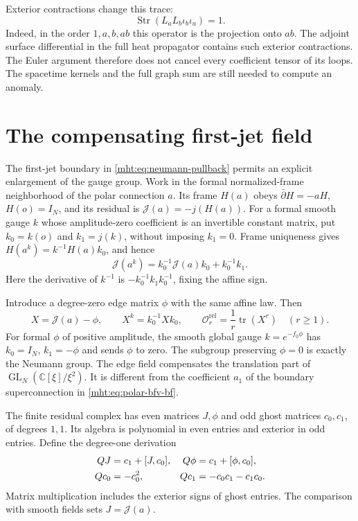 Exterior contractions change this trace:
\begin{equation}\label{mht:eq:surface-loop-detector}
 \operatorname{Str}(L_aL_b\iota_b\iota_a)=1.
\end{equation}
Indeed, in the order $1,a,b,ab$ this operator is the projection
onto $ab$. The adjoint surface differential in the full heat
propagator contains such exterior contractions. The Euler argument
therefore does not cancel every coefficient tensor of its loops.
The spacetime kernels and the full graph sum are still needed to
compute an anomaly.

\section{The compensating first-jet field}

The first-jet boundary in \eqref{mht:eq:neumann-pullback}
permits an explicit enlargement of the gauge group. Work in the
formal normalized-frame neighborhood of the polar connection $a$.
Its frame $H(a)$ obeys $\bar\partial H=-aH$, $H(o)=I_N$, and its
residual is $\mathcal J(a)=-j(H(a))$.
For a formal smooth gauge $k$ whose amplitude-zero coefficient is
an invertible constant matrix, put
$k_0=k(o)$ and $k_1=j(k)$, without imposing $k_1=0$.
Frame uniqueness gives
$H(a^k)=k^{-1}H(a)k_0$, and hence
\begin{equation}\label{mht:eq:affine-residual-gauge}
 \mathcal J(a^k)=k_0^{-1}\mathcal J(a)k_0+k_0^{-1}k_1.
\end{equation}
Here the derivative of $k^{-1}$ is
$-k_0^{-1}k_1k_0^{-1}$, fixing the affine sign.

Introduce a degree-zero edge matrix $\phi$ with the same affine
law. Then
\[
 X=\mathcal J(a)-\phi,\qquad
 X^k=k_0^{-1}Xk_0,\qquad
 \mathcal O_r^{\mathrm{rel}}=\frac1r\operatorname{tr}(X^r)
 \quad(r\ge1).
\]
For formal $\phi$ of positive amplitude, the smooth global gauge
$k=e^{-f_0\phi}$ has $k_0=I_N$, $k_1=-\phi$ and sends $\phi$ to
zero. The subgroup preserving $\phi=0$ is exactly the Neumann
group. The edge field compensates the translation part of
$\operatorname{GL}_N(\mathbb C[\xi]/\xi^2)$. It is different from
the coefficient $a_1$ of the boundary superconnection in
\eqref{mht:eq:polar-bfv-bf}.

The finite residual complex has even matrices $J,\phi$ and odd
ghost matrices $c_0,c_1$, of degrees $1,1$. Its algebra is polynomial
in even entries and exterior in odd entries. Define the degree-one
derivation
\begin{align}
 QJ&=c_1+[J,c_0],& Q\phi&=c_1+[\phi,c_0],\notag\\
 Qc_0&=-c_0^2,& Qc_1&=-c_0c_1-c_1c_0.
 \label{mht:eq:first-jet-brst}
\end{align}
Matrix multiplication includes the exterior signs of ghost entries.
The comparison with smooth fields sets $J=\mathcal J(a)$.

